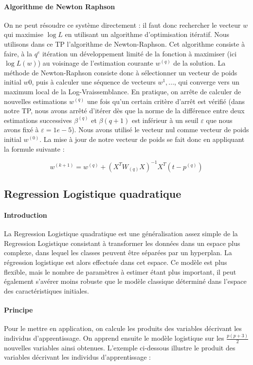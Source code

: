 \documentclass{report}
\begin{document}
\paragraph{Algorithme de Newton Raphson}
On ne peut résoudre ce système directement : il faut donc rechercher le vecteur $w$ qui maximise $\log L$ en utilisant un algorithme d'optimisation itératif. Nous utilisons dans ce TP l'algorithme de Newton-Raphson. Cet algorithme consiste à faire, à la $q^e$ itération un développement limité de la fonction à maximiser (ici $\log L(w)$) au voisinage de l'estimation courante $w^{(q)}$ de la solution. La méthode de Newton-Raphson consiste donc à sélectionner un vecteur de poids initial $w{0}$, puis à calculer une séquence de vecteurs $w^1, ...$, qui converge vers un maximum local de la Log-Vraissemblance. En pratique, on arrête de calculer de nouvelles estimations $w^{(q)}$ une fois qu'un certain critère d'arrêt est vérifié (dans notre TP, nous avons arrêté d'itérer dès que la norme de la différence entre deux estimations successives $\beta^{(q)}$ et $\beta{(q+1)}$ est inférieur à un seuil $\varepsilon$ que nous avons fixé à $\varepsilon = 1e -5$). Nous avons utilisé le vecteur nul comme vecteur de poids initial $w^{(0)}$. La mise à jour de notre vecteur de poids se fait donc en appliquant la formule suivante :


$$w^{(k+1)} = w^{(q)} + (X^T W_{(q)}X)^{-1}X^T(t-p^{(q)})$$


\subsection{Regression Logistique quadratique}
\paragraph{Introduction}
La Regression Logistique quadratique est une généralisation assez simple de la Regression Logistique consistant à transformer les données dans un espace plus complexe, dans lequel les classes peuvent être séparées par un hyperplan. La régression logistique est alors effectuée dans cet espace. Ce modèle est plus flexible, mais le nombre de paramètres à estimer étant plus important, il peut également s'avérer moins robuste que le modèle classique déterminé dans l'espace des caractéristiques initiales.

\paragraph{Principe}
Pour le mettre en application, on calcule les produits des variables décrivant les individus d'apprentissage. On apprend ensuite le modèle logistique sur les $\frac{p(p + 3)}{2}$ nouvelles variables ainsi obtenues. L'exemple ci-dessous illustre le produit des variables décrivant les individus d'apprentissage :
\end{document}
